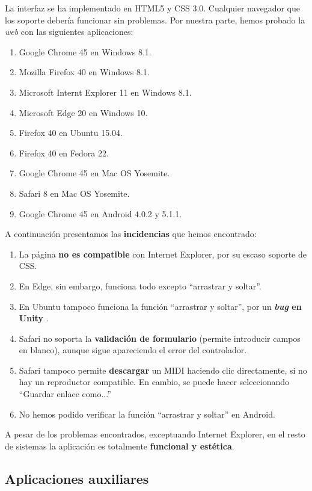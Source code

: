 La interfaz se ha implementado en \acrshort{HTML}5 y \acrshort{CSS} 3.0. Cualquier navegador que los soporte debería funcionar sin problemas. Por nuestra parte, hemos probado la \textit{web} con las siguientes aplicaciones:

\begin{enumerate}
	\item Google Chrome 45 en Windows 8.1.
	\item Mozilla Firefox 40 en Windows 8.1.
	\item Microsoft Internt Explorer 11 en Windows 8.1.
	\item Microsoft Edge 20 en Windows 10.
	\item Firefox 40 en Ubuntu 15.04.
	\item Firefox 40 en Fedora 22.
	\item Google Chrome 45 en Mac OS Yosemite.
	\item Safari 8 en Mac OS Yosemite.
	\item Google Chrome 45 en Android 4.0.2 y 5.1.1.
\end{enumerate}

A continuación presentamos las \textbf{incidencias} que hemos encontrado:

\begin{enumerate}
	\item La página \textbf{no es compatible} con Internet Explorer, por su escaso soporte de \acrshort{CSS}.
	\item En Edge, sin embargo, funciona todo excepto ``arrastrar y soltar''.
	\item En Ubuntu tampoco funciona la función ``arrastrar y soltar'', por un \textbf{\textit{bug} en Unity} \cite{unity_bug}.
	\item Safari no soporta la \textbf{validación de formulario} (permite introducir campos en blanco), aunque sigue apareciendo el error del controlador.
	\item Safari tampoco permite \textbf{descargar} un \acrshort{MIDI} haciendo clic directamente, si no hay un reproductor compatible. En cambio, se puede hacer seleccionando ``Guardar enlace como...''
	\item No hemos podido verificar la función ``arrastrar y soltar'' en Android.
\end{enumerate}

A pesar de los problemas encontrados, exceptuando Internet Explorer, en el resto de sistemas la aplicación es totalmente \textbf{funcional y estética}. 

\subsection{Aplicaciones auxiliares}

